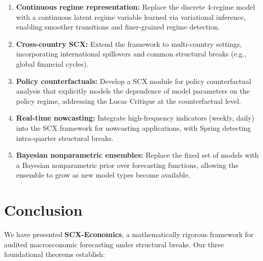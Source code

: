 \documentclass[12pt,a4paper]{article}
\begin{document}
\begin{enumerate}[label=(\arabic*), leftmargin=*]
    \item \textbf{Continuous regime representation:} Replace the
    discrete 4-regime model with a continuous latent regime variable
    learned via variational inference, enabling smoother transitions
    and finer-grained regime detection.

    \item \textbf{Cross-country SCX:} Extend the framework to
    multi-country settings, incorporating international spillovers
    and common structural breaks (e.g., global financial cycles).

    \item \textbf{Policy counterfactuals:} Develop a SCX module for
    policy counterfactual analysis that explicitly models the
    dependence of model parameters on the policy regime, addressing
    the Lucas Critique at the counterfactual level.

    \item \textbf{Real-time nowcasting:} Integrate high-frequency
    indicators (weekly, daily) into the SCX framework for
    nowcasting applications, with Spring detecting intra-quarter
    structural breaks.

    \item \textbf{Bayesian nonparametric ensembles:} Replace the
    fixed set of models with a Bayesian nonparametric prior over
    forecasting functions, allowing the ensemble to grow as new
    model types become available.
\end{enumerate}

\section{Conclusion}
\label{sec:conclusion}

We have presented \textbf{SCX-Economics}, a mathematically rigorous
framework for audited macroeconomic forecasting under structural
breaks.  Our three foundational theorems establish:
\end{document}
